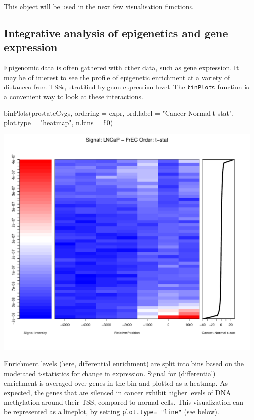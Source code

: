 This object will be used in the next few visualisation functions.

\subsection{Integrative analysis of epigenetics and gene expression}
\noindent Epigenomic data is often gathered with other data, such as gene expression. It may be of interest to see the profile of epigenetic enrichment at a variety of distances from TSSs, stratified by gene expression level. The \texttt{binPlots} function is a convenient way to look at these interactions.

\begin{Schunk}
\begin{Sinput}
 binPlots(prostateCvgs, ordering = expr, ord.label = "Cancer-Normal t-stat", 
     plot.type = "heatmap", n.bins = 50)
\end{Sinput}
\end{Schunk}
\includegraphics{visualisations-binPlotsHeatmap}

\noindent Enrichment levels (here, differential enrichment) are split into bins based on the moderated t-statistics for change in expression.  Signal for (differential) enrichment is averaged over genes in the bin and plotted as a heatmap.  As expected, the genes that are silenced in cancer exhibit higher levels of DNA methylation around their TSS, compared to normal cells.  This visualization can be represented as a lineplot, by setting \texttt{plot.type= "line"} (see below). \\


